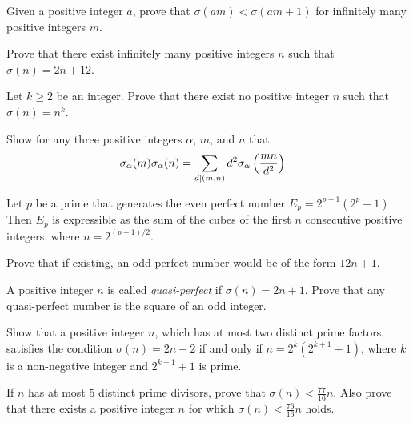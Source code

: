 	\begin{problem}[Romania TST 2010] %
	Given a positive integer $a$, prove that $\sigma(am) < \sigma(am + 1)$ for infinitely many positive integers $m$.
\end{problem}

\begin{problem}
	Prove that there exist infinitely many positive integers $n$ such that $\sigma(n)=2n+12$.
\end{problem}

\begin{problem}
	Let $k\geq 2$ be an integer. Prove that there exist no positive integer $n$ such that $\sigma(n)=n^k$.
\end{problem}

\begin{problem}
	Show for any three positive integers $\alpha$, $m$, and $n$ that
		\begin{align*}
			\sigma_{\alpha} (m)\sigma_{\alpha} (n)
				& = \sum_{d\mid (m,n)} d^2 \sigma_{\alpha}\left(\frac{mn}{d^2}\right)
		\end{align*}
\end{problem}
\begin{problem}%
	Let $p$ be a prime that generates the even perfect number $E_p=2^{p-1}(2^p-1)$. Then $E_p$ is expressible as the sum of the cubes of the first $n$ consecutive positive integers, where $n=2^{(p-1)/2}$.
\end{problem}

\begin{problem}
	Prove that if existing, an odd perfect number would be of the form $12n+1$.
\end{problem}

\begin{problem}[Putnam 1976]
	A positive integer $n$ is called \textit{quasi-perfect} if $\sigma(n)=2n+1$. Prove that any quasi-perfect number is the square of an odd integer.
\end{problem}


\begin{problem}
	Show that a positive integer $n$, which has at most two distinct prime factors, satisfies the condition $\sigma(n)=2n-2$ if and only if $n=2^k(2^{k+1}+1)$, where $k$ is a non-negative integer and $2^{k+1}+1$ is prime.
\end{problem}

\begin{problem}
	If $n$ has at most $5$ distinct prime divisors, prove that $\sigma(n) < \frac{77}{16} n.$ Also prove that there exists a positive integer $n$ for which $\sigma(n) < \frac{76}{16} n$ holds.
\end{problem}

